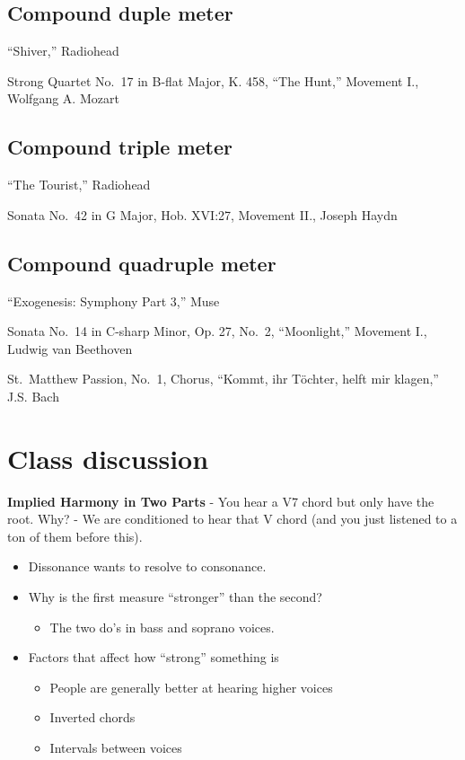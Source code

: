 \documentclass{book}
\providecommand{\tightlist}{%
  \setlength{\itemsep}{0pt}\setlength{\parskip}{0pt}}
\begin{document}
\hypertarget{compound-duple-meter}{%
\subsection{Compound duple meter}\label{compound-duple-meter}}

``Shiver,'' Radiohead

Strong Quartet No.~17 in B-flat Major, K. 458, ``The Hunt,'' Movement I.,
Wolfgang A. Mozart

\hypertarget{compound-triple-meter}{%
\subsection{Compound triple meter}\label{compound-triple-meter}}

``The Tourist,'' Radiohead

Sonata No.~42 in G Major, Hob. XVI:27, Movement II., Joseph Haydn

\hypertarget{compound-quadruple-meter}{%
\subsection{Compound quadruple meter}\label{compound-quadruple-meter}}

``Exogenesis: Symphony Part 3,'' Muse

Sonata No.~14 in C-sharp Minor, Op. 27, No.~2, ``Moonlight,'' Movement I.,
Ludwig van Beethoven

St.~Matthew Passion, No.~1, Chorus, ``Kommt, ihr Töchter, helft mir klagen,''
J.S. Bach

\hypertarget{class-discussion-31}{%
\section{Class discussion}\label{class-discussion-31}}

\textbf{Implied Harmony in Two Parts} - You hear a V7 chord but only have the
root. Why? - We are conditioned to hear that V chord (and you just listened to
a ton of them before this).

\begin{itemize}
\item
  Dissonance wants to resolve to consonance.
\item
  Why is the first measure ``stronger'' than the second?

  \begin{itemize}
  \tightlist
  \item
    The two do's in bass and soprano voices.
  \end{itemize}
\item
  Factors that affect how ``strong'' something is

  \begin{itemize}
  \tightlist
  \item
    People are generally better at hearing higher voices
  \item
    Inverted chords
  \item
    Intervals between voices
  \end{itemize}
\end{itemize}
\end{document}
